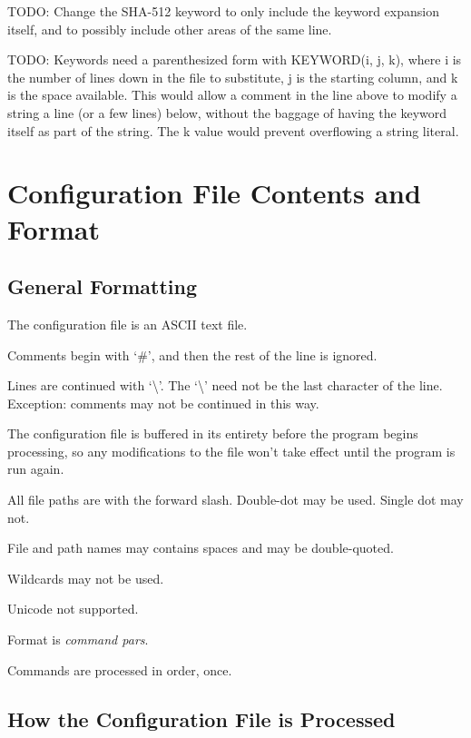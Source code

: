 \documentclass[letterpaper,10pt,titlepage]{article}
\begin{document}
TODO:  Change the SHA-512 keyword to only include the keyword expansion itself,
and to possibly include other areas of the same line.

TODO:  Keywords need a parenthesized form with KEYWORD(i, j, k), where i
is the number of lines down in the file to substitute, j is the starting column, and k is the
space available.  This would allow a comment in the line above to modify a string a line (or 
a few lines) below, without the baggage of having the keyword itself as part of the string.
The k value would prevent overflowing a string literal.

\section{Configuration File Contents and Format}
\label{scff0}

\subsection{General Formatting}
\label{scff0:sgfm0}

The configuration file is an ASCII text file.

Comments begin with `\#', and then the rest of the line is ignored.

Lines are continued with `\textbackslash{}'.  The `\textbackslash{}' need not be the last character of the line.
Exception:  comments may not be continued in this way.

The configuration file is buffered in its entirety before the program
begins processing, so any modifications to the file won't take effect until the
program is run again.

All file paths are with the forward slash.  Double-dot may be used.  Single dot may not.

File and path names may contains spaces and may be double-quoted.

Wildcards may not be used.

Unicode not supported.

Format is \emph{command pars}.

Commands are processed in order, once.


\subsection{How the Configuration File is Processed}
\label{scff0:shcp0}
\end{document}

